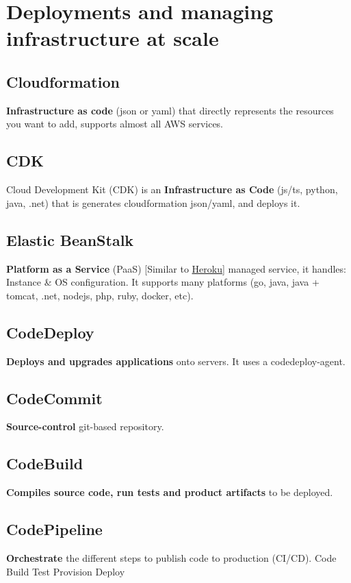 \section{Deployments and managing infrastructure at scale}\label{sec:deployments-and-managing-infrastructure-at-scale}

\subsection{Cloudformation}\label{subsec:cloudformation}
\textbf{Infrastructure as code} (json or yaml) that directly represents the resources you want to add, supports almost all AWS services.

\subsection{CDK}\label{subsec:cdk}
Cloud Development Kit (CDK) is an \textbf{Infrastructure as Code} (js/ts, python, java, .net) that is generates cloudformation json/yaml, and deploys it.

\subsection{Elastic BeanStalk}\label{subsec:beanstalk}
\textbf{Platform as a Service} (PaaS) [Similar to \href{https://www.heroku.com}{Heroku}] managed service, it handles: Instance \& OS configuration.
It supports many platforms (go, java, java + tomcat, .net, nodejs, php, ruby, docker, etc).

\subsection{CodeDeploy}\label{subsec:codedeploy}
\textbf{Deploys and upgrades applications} onto servers.
It uses a codedeploy-agent.

\subsection{CodeCommit}\label{subsec:codecommit}
\textbf{Source-control} git-based repository.

\subsection{CodeBuild}\label{subsec:codebuild}
\textbf{Compiles source code, run tests and product artifacts} to be deployed.

\subsection{CodePipeline}\label{subsec:codepipeline}
\textbf{Orchestrate} the different steps to publish code to production (CI/CD).\newline
Code \rightarrow Build \rightarrow Test \rightarrow Provision \rightarrow Deploy

